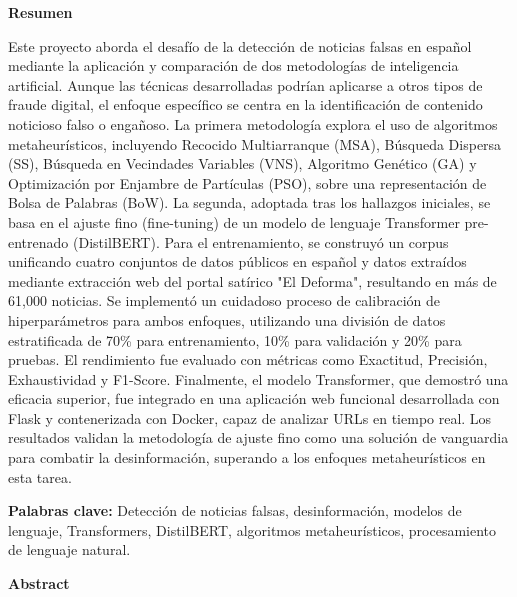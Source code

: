 \thispagestyle{plain}  
\vspace{0.9cm}
\textbf{{\Large Resumen}}
\vspace{0.9cm}

Este proyecto aborda el desafío de la detección de noticias falsas en español mediante la aplicación y comparación de dos metodologías de inteligencia artificial. Aunque las técnicas desarrolladas podrían aplicarse a otros tipos de fraude digital, el enfoque específico se centra en la identificación de contenido noticioso falso o engañoso. La primera metodología explora el uso de algoritmos metaheurísticos, incluyendo Recocido Multiarranque (MSA), Búsqueda Dispersa (SS), Búsqueda en Vecindades Variables (VNS), Algoritmo Genético (GA) y Optimización por Enjambre de Partículas (PSO), sobre una representación de Bolsa de Palabras (BoW). La segunda, adoptada tras los hallazgos iniciales, se basa en el ajuste fino (fine-tuning) de un modelo de lenguaje Transformer pre-entrenado (DistilBERT). Para el entrenamiento, se construyó un corpus unificando cuatro conjuntos de datos públicos en español y datos extraídos mediante extracción web del portal satírico "El Deforma", resultando en más de 61,000 noticias. Se implementó un cuidadoso proceso de calibración de hiperparámetros para ambos enfoques, utilizando una división de datos estratificada de 70\% para entrenamiento, 10\% para validación y 20\% para pruebas. El rendimiento fue evaluado con métricas como Exactitud, Precisión, Exhaustividad y F1-Score. Finalmente, el modelo Transformer, que demostró una eficacia superior, fue integrado en una aplicación web funcional desarrollada con Flask y contenerizada con Docker, capaz de analizar URLs en tiempo real. Los resultados validan la metodología de ajuste fino como una solución de vanguardia para combatir la desinformación, superando a los enfoques metaheurísticos en esta tarea.

\vspace{0.9cm}
\textbf{Palabras clave:} Detección de noticias falsas, desinformación, modelos de lenguaje, Transformers, DistilBERT, algoritmos metaheurísticos, procesamiento de lenguaje natural.

\shipout\null
\newpage

\thispagestyle{plain}  
\vspace{0.9cm}
\textbf{{\Large Abstract}}
\vspace{0.9cm}

